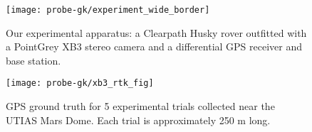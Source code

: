 \begin{table}
\centering
\caption{Comparison of average root mean squared errors (ARMSE) for rotational
  and translational components. Each trial is trained and tested from a
  particular category of raw data from the synthetic and KITTI datasets.}

\end{table}

\begin{figure}
    \centering
    \hspace*{0.25cm}
    \texttt{[image: probe-gk/experiment\_wide\_border]}
    \caption{Our experimental apparatus: a Clearpath Husky rover outfitted with a PointGrey XB3 stereo camera and a differential GPS receiver and base station.}
      \vspace{-0.5em}
   	    \label{fig:experiments}
\end{figure}

\begin{figure}
    \centering
	\texttt{[image: probe-gk/xb3\_rtk\_fig]}
    \caption{GPS ground truth for 5 experimental trials collected
      near the UTIAS Mars Dome. Each trial is approximately 250 m long.}
      \vspace{-0.5em}
    \label{fig:experiment_groundtruth}
\end{figure}

